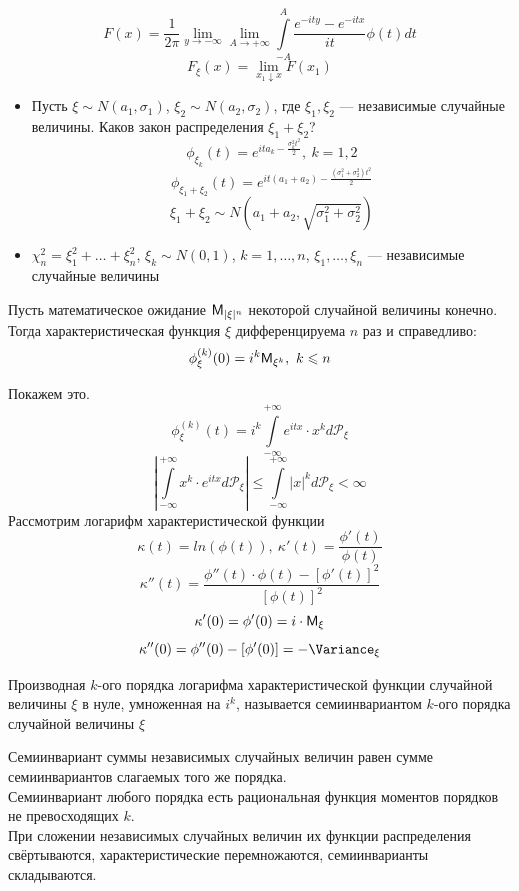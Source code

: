 \begin{enumerate}[wide, labelwidth=!, labelindent=0pt]
\[
	F(x) = \frac{1}{2 \pi} \lim\limits_{y \to -\infty} \lim\limits_{A \to +\infty} \int\limits_{-A}^{A} \frac{e^{-ity} - e^{-itx}}{it} \phi(t) dt
\]
\[
	F_{\xi} (x) = \lim\limits_{x_1 \downarrow x} F(x_1)
\]
\begin{example} 
	\begin{itemize}
		\item Пусть $\xi \sim N(a_1, \sigma_1)$, $\xi_2 \sim N(a_2, \sigma_2)$, где $\xi_1, \xi_2$ --- независимые случайные величины. Каков закон распределения $\xi_1 + \xi_2$?
\[
	\phi_{\xi_k} (t) = e^{it a_k - \frac{\sigma^2_k t^2}{2}}, \ k = 1, 2
\]
\[
	\phi_{\xi_1 + \xi_2} (t) = e^{it(a_1 + a_2) - \frac{(\sigma_1^2 + \sigma_2^2)t^2}{2}}
\]
\[
	\xi_1 + \xi_2 \sim N \left(a_1 + a_2, \sqrt{\sigma_1^2 + \sigma_2^2} \right)
\]
\item $\chi_n^2 = \xi_1^2 + \ldots + \xi_n^2$, $\xi_k \sim N (0, 1)$, $k = 1, \ldots, n$, $\xi_1, \ldots,\xi_n$ --- независимые случайные величины
	\end{itemize}
\end{example}
\begin{theorem}
	Пусть математическое ожидание $\mathsf{M}_{|\xi|^n}$ некоторой случайной величины конечно. Тогда характеристическая функция $\xi$ дифференцируема $n$ раз и справедливо:
\[
	\phi_{\xi}^{(k)} (0) = i^k \mathsf{M}_{\xi^k}, \ k \leqslant n
\]
\end{theorem}
Покажем это.
\[
	\phi_{\xi}^{(k)} (t) = i^k \int\limits_{-\infty}^{+\infty} e^{itx} \cdot x^k d \mathcal{P}_{\xi}
\]
\[
	\left| \int\limits_{-\infty}^{+\infty} x^k \cdot e^{itx} d \mathcal{P}_{\xi} \right| \leqslant \int\limits_{-\infty}^{+\infty} |x|^k d \mathcal{P}_{\xi} < \infty
\]
Рассмотрим логарифм характеристической функции
\[
	\kappa (t) = ln(\phi(t)), \ \kappa'(t) = \frac{\phi'(t)}{\phi(t)}
\]
\[
	\kappa''(t) = \frac{\phi''(t) \cdot \phi(t) - [\phi'(t)]^2}{[\phi(t)]^2}
\]
\[
	\kappa'(0) = \phi'(0) = i \cdot \mathsf{M}_{\xi}
\]
\[
	\kappa''(0) = \phi''(0) - [\phi'(0)] = - \Variance_{\xi}
\]
\begin{definition}
	Производная $k$-ого порядка логарифма характеристической функции случайной величины $\xi$ в нуле, умноженная на $i^k$, называется семиинвариантом $k$-ого порядка случайной величины $\xi$
\end{definition}
Семиинвариант суммы независимых случайных величин равен сумме семиинвариантов слагаемых того же порядка. \\
Семиинвариант любого порядка есть рациональная функция моментов порядков не превосходящих $k$. \\
При сложении независимых случайных величин их функции распределения свёртываются, характеристические перемножаются, семиинварианты складываются.


\end{enumerate}
